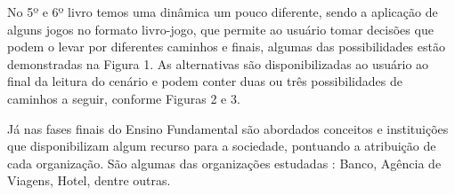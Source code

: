             No 5º e 6º livro temos uma dinâmica um pouco diferente, sendo a aplicação de alguns jogos no formato
            livro-jogo, que permite ao usuário tomar decisões que podem o levar por diferentes caminhos e finais,
            algumas das possibilidades estão demonstradas na Figura 1. As alternativas são disponibilizadas ao usuário
            ao final da leitura do cenário e podem conter duas ou três possibilidades de caminhos a seguir, conforme
            Figuras 2 e 3.

            Já nas fases finais do Ensino Fundamental são abordados conceitos e instituições que disponibilizam algum
            recurso para a sociedade, pontuando a atribuição de cada organização. São algumas das organizações estudadas
            : Banco, Agência de Viagens, Hotel, dentre outras.

